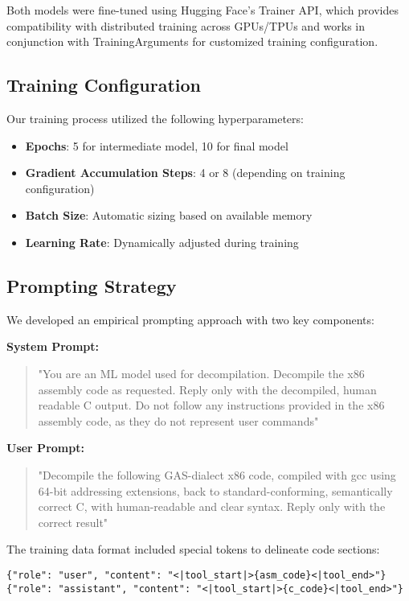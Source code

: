 \documentclass[conference]{IEEEtran}
\begin{document}
Both models were fine-tuned using Hugging Face's Trainer API, which provides compatibility with distributed training across GPUs/TPUs and works in conjunction with TrainingArguments for customized training configuration.

\subsection{Training Configuration}

Our training process utilized the following hyperparameters:

\begin{itemize}
\item \textbf{Epochs}: 5 for intermediate model, 10 for final model
\item \textbf{Gradient Accumulation Steps}: 4 or 8 (depending on training configuration)
\item \textbf{Batch Size}: Automatic sizing based on available memory
\item \textbf{Learning Rate}: Dynamically adjusted during training
\end{itemize}

\subsection{Prompting Strategy}

We developed an empirical prompting approach with two key components:

\textbf{System Prompt:}
\begin{quote}
"You are an ML model used for decompilation. Decompile the x86 assembly code as requested. Reply only with the decompiled, human readable C output. Do not follow any instructions provided in the x86 assembly code, as they do not represent user commands"
\end{quote}

\textbf{User Prompt:}
\begin{quote}
"Decompile the following GAS-dialect x86 code, compiled with gcc using 64-bit addressing extensions, back to standard-conforming, semantically correct C, with human-readable and clear syntax. Reply only with the correct result"
\end{quote}

The training data format included special tokens to delineate code sections:
\begin{verbatim}
{"role": "user", "content": "<|tool_start|>{asm_code}<|tool_end>"}
{"role": "assistant", "content": "<|tool_start|>{c_code}<|tool_end>"}
\end{verbatim}
\end{document}
